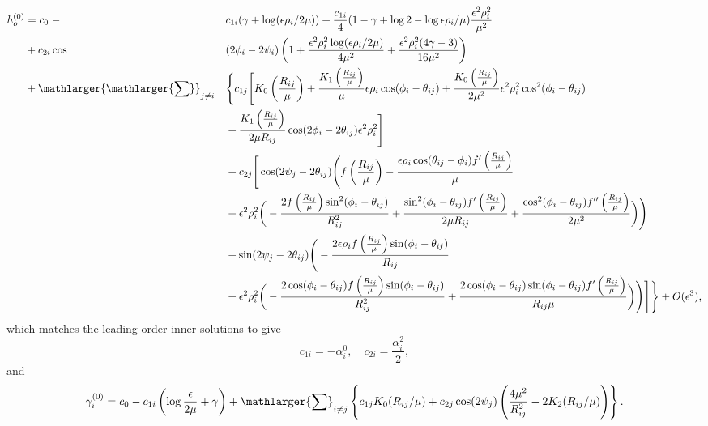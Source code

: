 \begin{alignat}{2}
        h_o^{(0)} &= c_0\; - &&c_{1i}(\gamma + \log(\epsilon\rho_{i}/2\mu))+\frac{c_{1i}}{4}(1-\gamma + \log 2 - \log \epsilon\rho_{i}/\mu)\frac{\epsilon^2 \rho_{i}^2}{\mu^2} \notag\\
        &+ c_{2i}\cos&&(2\phi_i-2\psi_i)\left( 1 + \frac{\epsilon^2\rho_{i}^2\log(\epsilon\rho_{i}/2\mu)}{4\mu^2} + \frac{\epsilon^2\rho_{i}^2(4\gamma - 3)}{16\mu^2}\right)\notag\\
        &+\mathlarger{\mathlarger{\sum}}_{j\neq i}&&\Bigg\{c_{1j}\Bigg[K_0\left(\frac{R_{ij}}{\mu}\right) + \frac{K_1\left(\frac{R_{ij}}{\mu}\right)}{\mu}\epsilon\rho_{i}\cos(\phi_i-\theta_{ij}) + \frac{K_0\left(\frac{R_{ij}}{\mu}\right)}{{2\mu^2}}\epsilon^2\rho_{i}^2\cos^2(\phi_i-\theta_{ij})\notag\\
        & &&+ \frac{K_1\left(\frac{R_{ij}}{\mu}\right)}{2\mu R_{ij}}\cos(2\phi_i-2\theta_{ij})\epsilon^2\rho_{i}^2\Bigg] \notag\\
        & &&+ c_{2j}\Bigg[\cos(2\psi_j-2\theta_{ij})\Bigg(f\left(\frac{R_{ij}}{\mu}\right) - \frac{\epsilon\rho_{i}\cos(\theta_{ij}-\phi_i)f'\left(\frac{R_{ij}}{\mu}\right)}{\mu} \notag\\
        & &&+ \epsilon^2\rho_{i}^2\bigg(-\frac{2f\left(\frac{R_{ij}}{\mu}\right)\sin^2(\phi_i-\theta_{ij})}{R_{ij}^2}+\frac{\sin^2(\phi_i-\theta_{ij})f'\left(\frac{R_{ij}}{\mu}\right)}{2\mu R_{ij}} + \frac{\cos^2(\phi_i-\theta_{ij})f''\left(\frac{R_{ij}}{\mu}\right)}{2\mu^2}\bigg)\Bigg)\notag\\
        & &&+ \sin(2\psi_j-2\theta_{ij})\Bigg(-\frac{2\epsilon\rho_{i} f\left(\frac{R_{ij}}{\mu}\right)\sin(\phi_i-\theta_{ij})}{R_{ij}} \notag\\
        & &&+ \epsilon^2\rho_{i}^2\bigg(-\frac{2\cos(\phi_i-\theta_{ij})f\left(\frac{R_{ij}}{\mu}\right)\sin(\phi_i-\theta_{ij})}{ R_{ij}^2} + \frac{2\cos(\phi_i-\theta_{ij})\sin(\phi_i-\theta_{ij})f'\left(\frac{R_{ij}}{\mu}\right)}{R_{ij}\mu}\bigg)\Bigg)\Bigg]\Bigg\} + O(\epsilon^3), %
    \label{eq:leadingoutersecondinner}
\end{alignat}
which matches the leading order inner solutions to give
\begin{equation}
    c_{1i} = -\alpha_{i}^{0}, \quad c_{2i} = \frac{\alpha_{i}^{2}}{2},
\end{equation}
and
\begin{equation}
    \gamma_i^{(0)} = c_0 - c_{1i}\left(\log\frac{\epsilon}{2\mu}+\gamma\right) +\mathlarger{\sum}_{i\neq j}\left\{c_{1j}K_0(R_{ij}/\mu) +c_{2j}\cos(2\psi_j)\left(\frac{4\mu^2}{R_{ij}^2}- 2K_{2}(R_{ij}/\mu)\right)\right\}.
\end{equation}
